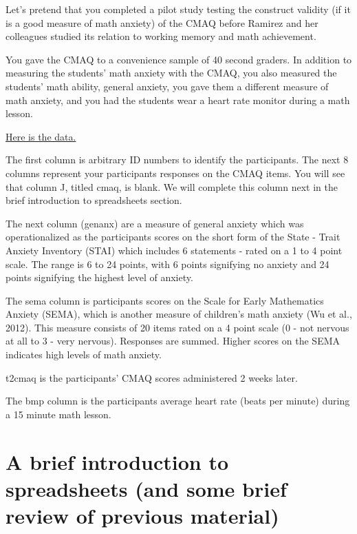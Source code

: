 \documentclass[
]{book}
\begin{document}
Let's pretend that you completed a pilot study testing the construct validity (if it is a good measure of math anxiety) of the CMAQ before Ramirez and her colleagues studied its relation to working memory and math achievement.

You gave the CMAQ to a convenience sample of 40 second graders. In addition to measuring the students' math anxiety with the CMAQ, you also measured the students' math ability, general anxiety, you gave them a different measure of math anxiety, and you had the students wear a heart rate monitor during a math lesson.

\href{https://docs.google.com/spreadsheets/d/1Ty_kgqdsTM8f1h-lJ-HjkpYqXGc7hAAyP_F9vq-tdEI/edit?usp=sharing}{Here is the data.}

The first column is arbitrary ID numbers to identify the participants. The next 8 columns represent your participants responses on the CMAQ items. You will see that column J, titled cmaq, is blank. We will complete this column next in the brief introduction to spreadsheets section.

The next column (genanx) are a measure of general anxiety which was operationalized as the participants scores on the short form of the State - Trait Anxiety Inventory (STAI) which includes 6 statements - rated on a 1 to 4 point scale. The range is 6 to 24 points, with 6 points signifying no anxiety and 24 points signifying the highest level of anxiety.

The sema column is participants scores on the Scale for Early Mathematics Anxiety (SEMA), which is another measure of children's math anxiety (Wu et al., 2012). This measure consists of 20 items rated on a 4 point scale (0 - not nervous at all to 3 - very nervous). Responses are summed. Higher scores on the SEMA indicates high levels of math anxiety.

t2cmaq is the participants' CMAQ scores administered 2 weeks later.

The bmp column is the participants average heart rate (beats per minute) during a 15 minute math lesson.

\hypertarget{a-brief-introduction-to-spreadsheets-and-some-brief-review-of-previous-material}{%
\section{A brief introduction to spreadsheets (and some brief review of previous material)}\label{a-brief-introduction-to-spreadsheets-and-some-brief-review-of-previous-material}}
\end{document}
